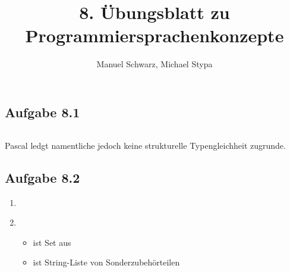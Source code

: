 \documentclass[a4paper, 12pt]{article}
\title{8. Übungsblatt zu Programmiersprachenkonzepte}
\author{Manuel Schwarz, Michael Stypa}
\begin{document}
\maketitle

\subsection*{Aufgabe 8.1}
\inputminted{pascal}{aufg1.pas}
Pascal ledgt namentliche jedoch keine strukturelle Typengleichheit zugrunde.

\subsection*{Aufgabe 8.2}
\begin{enumerate}
 \item \inputminted{pascal}{aufg2.pas}
 \item \begin{itemize}
        \item \texttt@zubehoer@ ist Set aus
              \texttt@predefmerkmal@
        \item \texttt@sonderz@ ist String-Liste von
              Sonderzubehörteilen
       \end{itemize}

\end{enumerate}
\end{document}
